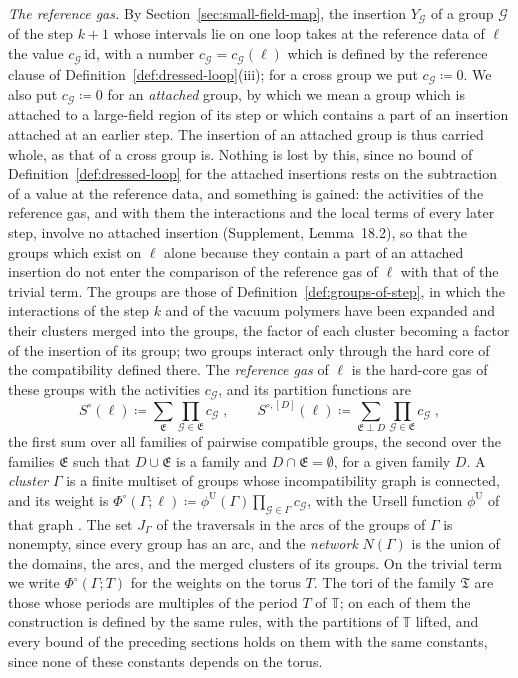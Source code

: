 \documentclass[11pt]{preprint}
\numberwithin{equation}{section}
\theoremstyle{definition}
\theoremstyle{remark}
\theoremstyle{plain}
\begin{document}
\emph{The reference gas.} By Section~\ref{sec:small-field-map}, the insertion $Y_{\mathcal G}$ of a group $\mathcal G$ of the step $k + 1$ whose intervals lie on one loop takes at the reference data of $\ell$ the value $c_{\mathcal G}\,\mathrm{id}$, with a number $c_{\mathcal G} = c_{\mathcal G}(\ell)$ which is defined by the reference clause of Definition~\ref{def:dressed-loop}(iii); for a cross group we put $c_{\mathcal G} \coloneqq 0$. We also put $c_{\mathcal G} \coloneqq 0$ for an \emph{attached} group, by which we mean a group which is attached to a large-field region of its step or which contains a part of an insertion attached at an earlier step. The insertion of an attached group is thus carried whole, as that of a cross group is. Nothing is lost by this, since no bound of Definition~\ref{def:dressed-loop} for the attached insertions rests on the subtraction of a value at the reference data, and something is gained: the activities of the reference gas, and with them the interactions and the local terms of every later step, involve no attached insertion (Supplement, Lemma~18.2), so that the groups which exist on $\ell$ alone because they contain a part of an attached insertion do not enter the comparison of the reference gas of $\ell$ with that of the trivial term. The groups are those of Definition~\ref{def:groups-of-step}, in which the interactions of the step $k$ and of the vacuum polymers have been expanded and their clusters merged into the groups, the factor of each cluster becoming a factor of the insertion of its group; two groups interact only through the hard core of the compatibility defined there. The \emph{reference gas} of $\ell$ is the hard-core gas of these groups with the activities $c_{\mathcal G}$, and its partition functions are
\begin{equation}\label{eq:reference-partition}
    S^\circ(\ell) \coloneqq \sum_{\mathfrak E}\prod_{\mathcal G \in \mathfrak E}c_{\mathcal G}\;,
    \qquad
    S^{\circ,[D]}(\ell) \coloneqq \sum_{\mathfrak E \perp D}\prod_{\mathcal G \in \mathfrak E}c_{\mathcal G}\;,
\end{equation}
the first sum over all families of pairwise compatible groups, the second over the families $\mathfrak E$ such that $D \cup \mathfrak E$ is a family and $D \cap \mathfrak E = \emptyset$, for a given family $D$. A \emph{cluster} $\Gamma$ is a finite multiset of groups whose incompatibility graph is connected, and its weight is $\Phi^\circ(\Gamma; \ell) \coloneqq \phi^{\mathrm U}(\Gamma)\prod_{\mathcal G \in \Gamma}c_{\mathcal G}$, with the Ursell function $\phi^{\mathrm U}$ of that graph \cite[Chapter~5]{FriedliVelenik}. The set $J_\Gamma$ of the traversals in the arcs of the groups of $\Gamma$ is nonempty, since every group has an arc, and the \emph{network} $N(\Gamma)$ is the union of the domains, the arcs, and the merged clusters of its groups. On the trivial term we write $\Phi^\circ(\Gamma; T)$ for the weights on the torus $T$. The tori of the family $\mathfrak T$ are those whose periods are multiples of the period $T$ of $\mathbb T$; on each of them the construction is defined by the same rules, with the partitions of $\mathbb T$ lifted, and every bound of the preceding sections holds on them with the same constants, since none of these constants depends on the torus.
\end{document}
